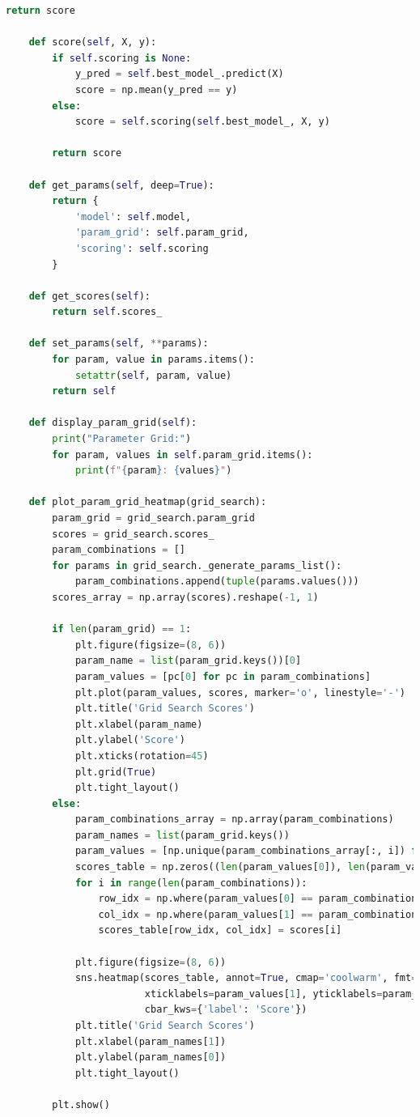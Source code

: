 \documentclass[letterpaper,10pt]{article}
\begin{document}
\begin{lstlisting}[language=Python, caption=optimisers.py - GridSearch]
        return score

    def score(self, X, y):
        if self.scoring is None:
            y_pred = self.best_model_.predict(X)
            score = np.mean(y_pred == y)
        else:
            score = self.scoring(self.best_model_, X, y)

        return score

    def get_params(self, deep=True):
        return {
            'model': self.model,
            'param_grid': self.param_grid,
            'scoring': self.scoring
        }
    
    def get_scores(self):
        return self.scores_

    def set_params(self, **params):
        for param, value in params.items():
            setattr(self, param, value)
        return self

    def display_param_grid(self):
        print("Parameter Grid:")
        for param, values in self.param_grid.items():
            print(f"{param}: {values}")
    
    def plot_param_grid_heatmap(grid_search):
        param_grid = grid_search.param_grid
        scores = grid_search.scores_
        param_combinations = []
        for params in grid_search._generate_params_list():
            param_combinations.append(tuple(params.values()))
        scores_array = np.array(scores).reshape(-1, 1)

        if len(param_grid) == 1:
            plt.figure(figsize=(8, 6))
            param_name = list(param_grid.keys())[0]
            param_values = [pc[0] for pc in param_combinations]
            plt.plot(param_values, scores, marker='o', linestyle='-')
            plt.title('Grid Search Scores')
            plt.xlabel(param_name)
            plt.ylabel('Score')
            plt.xticks(rotation=45)
            plt.grid(True)
            plt.tight_layout()
        else:
            param_combinations_array = np.array(param_combinations)
            param_names = list(param_grid.keys())
            param_values = [np.unique(param_combinations_array[:, i]) for i in range(len(param_names))]
            scores_table = np.zeros((len(param_values[0]), len(param_values[1])))
            for i in range(len(param_combinations)):
                row_idx = np.where(param_values[0] == param_combinations[i][0])[0][0]
                col_idx = np.where(param_values[1] == param_combinations[i][1])[0][0]
                scores_table[row_idx, col_idx] = scores[i]

            plt.figure(figsize=(8, 6))
            sns.heatmap(scores_table, annot=True, cmap='coolwarm', fmt='.3f',
                        xticklabels=param_values[1], yticklabels=param_values[0],
                        cbar_kws={'label': 'Score'})
            plt.title('Grid Search Scores')
            plt.xlabel(param_names[1])
            plt.ylabel(param_names[0])
            plt.tight_layout()

        plt.show()

\end{lstlisting}
\end{document}
